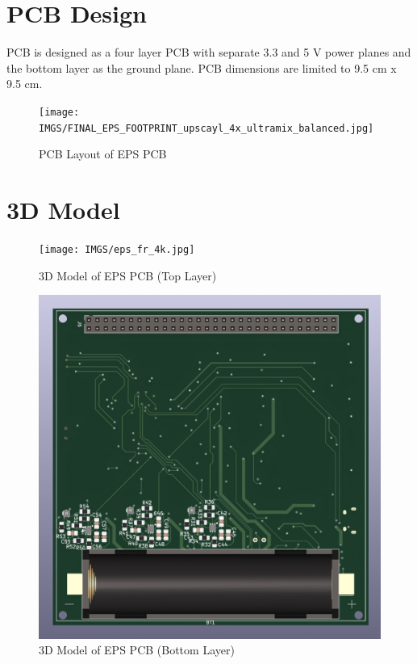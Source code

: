  \section{PCB Design}
 PCB is designed as a four layer PCB with separate 3.3 and 5 V power planes and the bottom layer as the ground plane. PCB dimensions are limited to 9.5 cm x 9.5 cm.
 
 
  \begin{figure}[H]
 	\centering
 	\texttt{[image: IMGS/FINAL\_EPS\_FOOTPRINT\_upscayl\_4x\_ultramix\_balanced.jpg]}
 	\caption{\centering PCB Layout of EPS PCB}
 	\label{fig:epsfp}
 \end{figure}
 
\section{3D Model}

 
 \begin{figure}[H]
 	\centering
 	\texttt{[image: IMGS/eps\_fr\_4k.jpg]}
 	\caption{\centering 3D Model of EPS PCB (Top Layer)}
 	\label{fig:eps3dfr}
 \end{figure}
 
 
  \begin{figure}[H]
 	\centering
 	\includegraphics[width=0.99\columnwidth]{IMGS/eps_bk-4k.jpg}
 	\caption{\centering 3D Model of EPS PCB (Bottom Layer)}
 	\label{fig:eps3dbk}
 \end{figure}
 

